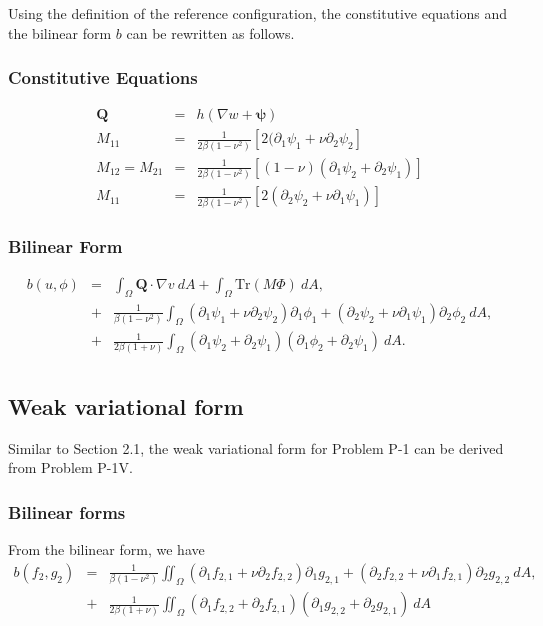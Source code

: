 \documentclass[../../main.tex]{subfiles}
\begin{document}
Using the definition of the reference configuration, the constitutive equations and the bilinear form $b$ can be rewritten as follows.

\subsubsection{Constitutive Equations}
\begin{eqnarray}
	\boldsymbol{Q} & = & h(\nabla w + \boldsymbol{\psi}) \label{eq:P_Model:CE1D}\\
	M_{11} & = & \frac{1}{2\beta(1-\nu^2)} \left[ 2(\partial_1\psi_1 + \nu \partial_2 \psi_2 \right] \label{eq:P_Model:CE2D}\\
	M_{12} = M_{21} & = & \frac{1}{2\beta(1-\nu^2)} \left[ (1-\nu)(\partial_1\psi_2 + \partial_2 \psi_1) \right] \label{eq:P_Model:CE3D}\\
	M_{11} & = & \frac{1}{2\beta(1-\nu^2)} \left[ 2(\partial_2 \psi_2 + \nu \partial_1 \psi_1)\right] \label{eq:P_Model:CE4D}
\end{eqnarray}

\subsubsection{Bilinear Form}
\begin{eqnarray*}
b(u,\phi) & = & \int_\Omega \boldsymbol{Q} \cdot \nabla v \ dA + \int_{\Omega} \textrm{Tr}(M\Phi) \ dA,\\
	& + & \frac{1}{\beta(1-\nu^2)}\int_{\Omega} (\partial_1\psi_1 + \nu\partial_2\psi_2)\partial_1\phi_1+ (\partial_2\psi_2 + \nu\partial_1\psi_1)\partial_2\phi_2 \ dA,\\
	& + & \frac{1}{2\beta(1+\nu)}\int_{\Omega} (\partial_1\psi_2+\partial_2\psi_1)(\partial_1\phi_2+\partial_2\psi_1) \ dA.\\
\end{eqnarray*}

\subsection{Weak variational form}
Similar to Section 2.1, the weak variational form for Problem P-1 can be derived from Problem P-1V.

\subsubsection{Bilinear forms}
From the bilinear form, we have
\begin{eqnarray*}
	b(f_2,g_2) & = & \frac{1}{\beta(1-\nu^2)}\iint_{\Omega} (\partial_1f_{2,1} + \nu\partial_2f_{2,2})\partial_1g_{2,1}+ (\partial_2f_{2,2} + \nu\partial_1f_{2,1})\partial_2g_{2,2} \ dA,\\
	& + & \frac{1}{2\beta(1+\nu)}\iint_{\Omega} (\partial_1f_{2,2}+\partial_2f_{2,1})(\partial_1g_{2,2}+\partial_2 g_{2,1}) \ dA
\end{eqnarray*}
\end{document}
